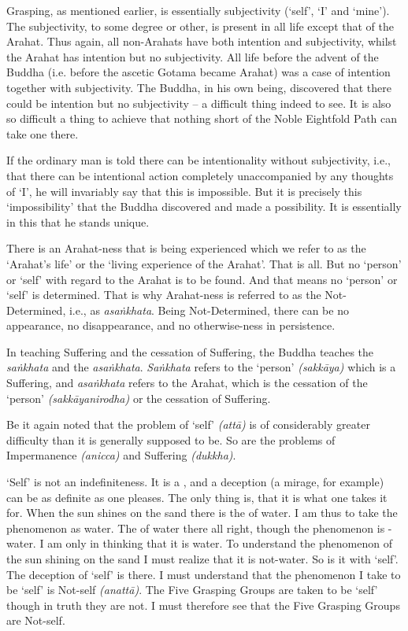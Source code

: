 Grasping, as mentioned earlier, is essentially subjectivity (`self', `I' and `mine'). The subjectivity, to some degree or other, is present in all life except that of the Arahat. Thus again, all non-Arahats have both intention and subjectivity, whilst the Arahat has intention but no subjectivity. All life before the advent of the Buddha (i.e. before the ascetic Gotama became Arahat) was a case of intention together with subjectivity. The Buddha, in his own being, discovered that there could be intention but no subjectivity -- a difficult thing indeed to see. It is also so difficult a thing to achieve that nothing short of the Noble Eightfold Path can take one there.

If the ordinary man is told there can be intentionality without subjectivity, i.e., that there can be intentional action completely unaccompanied by any thoughts of `I', he will invariably say that this is impossible. But it is precisely this `impossibility' that the Buddha discovered and made a possibility. It is essentially in this that he stands unique.

There is an Arahat-ness that is being experienced which we refer to as the `Arahat's life' or the `living experience of the Arahat'. That is all. But no `person' or `self' with regard to the Arahat is to be found. And that means no `person' or `self' is determined. That is why Arahat-ness is referred to as the Not-Determined, i.e., as \emph{asaṅkhata}. Being Not-Determined, there can be no appearance, no disappearance, and no otherwise-ness in persistence.

In teaching Suffering and the cessation of Suffering, the Buddha teaches the \emph{saṅkhata} and the \emph{asaṅkhata}. \emph{Saṅkhata} refers to the `person' \emph{(sakkāya)} which is a Suffering, and \emph{asaṅkhata} refers to the Arahat, which is the cessation of the `person' \emph{(sakkāyanirodha)} or the cessation of Suffering.

\sectionBreak

Be it again noted that the problem of `self' \emph{(attā)} is of considerably greater difficulty than it is generally supposed to be. So are the problems of Impermanence \emph{(anicca)} and Suffering \emph{(dukkha)}.

`Self' is not an indefiniteness. It is a , and a deception (a mirage, for example) can be as definite as one pleases. The only thing is, that it is  what one takes it for. When the sun shines on the sand there is the  of water. I am thus  to take the phenomenon as water. The  of water  there all right, though the phenomenon is -water. I am only  in thinking that it is water. To understand the phenomenon of the sun shining on the sand I must realize that it is not-water. So is it with `self'. The deception of `self' is there. I must understand that the phenomenon I take to be `self' is Not-self \emph{(anattā)}. The Five Grasping Groups are taken to be `self' though in truth they are not. I must therefore see that the Five Grasping Groups are Not-self.

